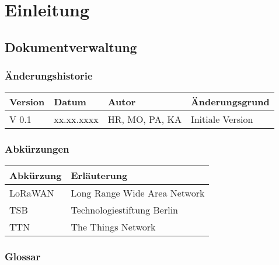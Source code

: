 \section{Einleitung}

\subsection{Dokumentverwaltung}

\subsubsection{Änderungshistorie}

\begin{table}[H] %
\begin{tabularx}{\textwidth}{ |X|X|X|X| }
	\hline  %
	\rowcolor[gray]{.8}%
	\rule{0pt}{18pt}%
	\textbf{Version} & \textbf{Datum} & \textbf{Autor} & \textbf{Änderungsgrund} \\
	\hline  %
	V 0.1 & xx.xx.xxxx & HR, MO, PA, KA & Initiale Version \\
	\hline
\end{tabularx}
\end{table}

\subsubsection{Abkürzungen}

\begin{table}[H] %
	\centering
	\begin{tabular}{ |l|l| } %
		\hline  %
		\rowcolor[gray]{.8}%
		\rule{0pt}{18pt}%
		\textbf{Abkürzung} & \textbf{Erläuterung} \\
		\hline  %
		LoRaWAN & Long Range Wide Area Network \\
		\hline
		TSB & Technologiestiftung Berlin \\
		\hline
		TTN & The Things Network \\
		\hline
	\end{tabular}
\end{table}

\subsubsection{Glossar}

